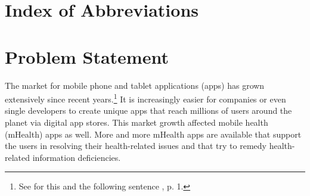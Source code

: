 \documentclass[
	a4paper,
	oneside,
	12pt,
	liststotocnumbered
]{article}
\let\cite\textcite
\begin{document}
\renewcommand{\figurename}{Figure}
\renewcommand{\tablename}{Table}
\renewcommand\thefigure{\arabic{section}-\arabic{figure}}
\renewcommand\thetable{Tab. \arabic{section}-\arabic{table}}
\newcommand{\todo}[1]{\textbf{\textsc{\textcolor{red}{TODO: #1}}}}

\newcommand{\mH}{mHealth }
\newcommand{\ap}{app provider }
\newcommand{\pp}{privacy policy }
\newcommand{\pps}{privacy policies }
\newcommand{\sca}{static code analysis }
\newcommand{\Sca}{Static code analysis }
\newcommand{\pra}{information privacy risk assessment }
\newcommand{\prfs}{information privacy risk factors }
\newcommand{\ipr}{information privacy risks }
\newcommand{\iprfs}{information privacy risk factors }
\newcommand{\iprs}{information privacy risk score }
\newcommand{\gui}{graphical user interface }
\newcommand{\ipp}{information privacy practices }




\tableofcontents
\newpage

\section*{Index of Abbreviations}
\begin{acronym}[TTTTTTTTTTTTTTTTTTTT]
\end{acronym}
\newpage

\normalsize
{}

\section{Problem Statement}
The market for mobile phone and tablet applications (apps) has grown extensively since recent years.\footnote{See for this and the following sentence \cite{Enck2011}, p. 1.}
It is increasingly easier for companies or even single developers to create unique apps that reach millions of users around the planet via digital app stores.
This market growth affected mobile health (\acs{mHealth}) apps as well. 
More and more \mH apps are available that support the users in resolving their health-related issues and that try to remedy health-related information deficiencies. 
\end{document}
